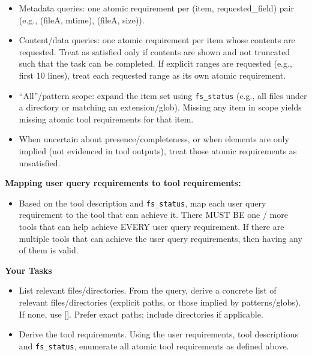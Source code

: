 \begin{ColorBlock}[Prompt]
\begin{itemize}
\begin{itemize}
      \item Metadata queries: one atomic requirement per (item, requested\_field) pair (e.g., (fileA, mtime), (fileA, size)).
      \item Content/data queries: one atomic requirement per item whose contents are requested. Treat as satisfied only if contents are shown and not truncated such that the task can be completed. If explicit ranges are requested (e.g., first 10 lines), treat each requested range as its own atomic requirement.
      \item ``All''/pattern scope: expand the item set using \texttt{fs\_status} (e.g., all files under a directory or matching an extension/glob). Missing any item in scope yields missing atomic tool requirements for that item.
      \item When uncertain about presence/completeness, or when elements are only implied (not evidenced in tool outputs), treat those atomic requirements as unsatisfied.
    \end{itemize}
\end{itemize}

\textbf{Mapping user query requirements to tool requirements:}
\begin{itemize}
  \item Based on the tool description and \texttt{fs\_status}, map each user query requirement to the tool that can achieve it. There MUST BE one / more tools that can help achieve EVERY user query requirement. If there are multiple tools that can achieve the user query requirements, then having any of them is valid.
\end{itemize}
\textbf{Your Tasks}
\begin{itemize}
  \item List relevant files/directories. From the query, derive a concrete list of relevant files/directories (explicit paths, or those implied by patterns/globs). If none, use []. Prefer exact paths; include directories if applicable.

  \item Derive the tool requirements. Using the user requirements, tool descriptions and \texttt{fs\_status}, enumerate all atomic tool requirements as defined above.


\end{itemize}
\end{ColorBlock}
